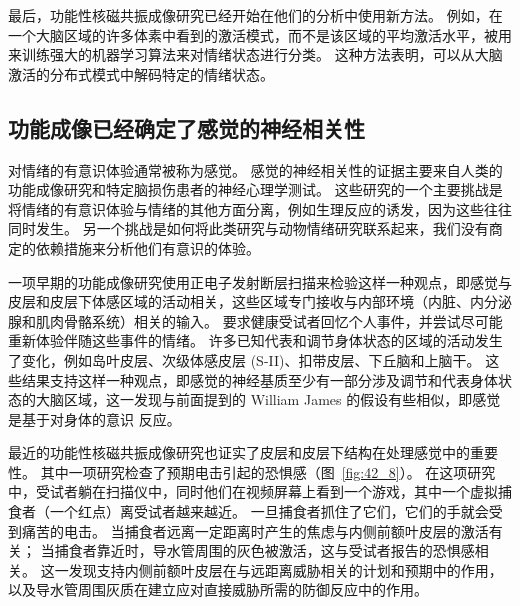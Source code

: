 最后，功能性核磁共振成像研究已经开始在他们的分析中使用新方法。
例如，在一个大脑区域的许多体素中看到的激活模式，而不是该区域的平均激活水平，被用来训练强大的机器学习算法来对情绪状态进行分类。
这种方法表明，可以从大脑激活的分布式模式中解码特定的情绪状态。



\subsection{功能成像已经确定了感觉的神经相关性}

对情绪的有意识体验通常被称为感觉。
感觉的神经相关性的证据主要来自人类的功能成像研究和特定脑损伤患者的神经心理学测试。
这些研究的一个主要挑战是将情绪的有意识体验与情绪的其他方面分离，例如生理反应的诱发，因为这些往往同时发生。
另一个挑战是如何将此类研究与动物情绪研究联系起来，我们没有商定的依赖措施来分析他们有意识的体验。


一项早期的功能成像研究使用正电子发射断层扫描来检验这样一种观点，即感觉与皮层和皮层下体感区域的活动相关，这些区域专门接收与内部环境（内脏、内分泌腺和肌肉骨骼系统）相关的输入。
要求健康受试者回忆个人事件，并尝试尽可能重新体验伴随这些事件的情绪。
许多已知代表和调节身体状态的区域的活动发生了变化，例如岛叶皮层、次级体感皮层 (S-II)、扣带皮层、下丘脑和上脑干。
这些结果支持这样一种观点，即感觉的神经基质至少有一部分涉及调节和代表身体状态的大脑区域，这一发现与前面提到的 William James 的假设有些相似，即感觉是基于对身体的意识 反应。


最近的功能性核磁共振成像研究也证实了皮层和皮层下结构在处理感觉中的重要性。
其中一项研究检查了预期电击引起的恐惧感（图~\ref{fig:42_8}）。
在这项研究中，受试者躺在扫描仪中，同时他们在视频屏幕上看到一个游戏，其中一个虚拟捕食者（一个红点）离受试者越来越近。
一旦捕食者抓住了它们，它们的手就会受到痛苦的电击。
当捕食者远离一定距离时产生的焦虑与内侧前额叶皮层的激活有关；
当捕食者靠近时，导水管周围的灰色被激活，这与受试者报告的恐惧感相关。
这一发现支持内侧前额叶皮层在与远距离威胁相关的计划和预期中的作用，以及导水管周围灰质在建立应对直接威胁所需的防御反应中的作用。


